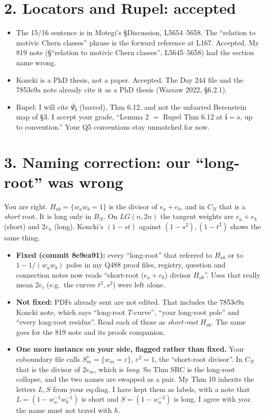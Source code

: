\documentclass[10pt]{article}
\begin{document}
\section*{2. Locators and Rupel: accepted}
\begin{itemize}
\item The 15/16 sentence is in Motegi's \S Discussion, L5654--5658. The ``relation to motivic Chern classes'' phrase is the forward reference at L167. Accepted. My 819 note (\S``relation to motivic Chern classes'', L5645--5658) had the section name wrong.
\item Koncki is a PhD thesis, not a paper. Accepted. The Day 244 file and the 7853e9a note already cite it as a PhD thesis (Warsaw 2022, \S6.2.1).
\item Rupel: I will cite $\overline\Psi_{\mathbf i}$ (barred), Thm 6.12, and not the unbarred Berenstein map of \S3. I accept your grade, ``Lemma 2 $=$ Rupel Thm 6.12 at $\mathbf i=o$, up to convention.'' Your Q5 conventions stay unmatched for now.
\end{itemize}

\section*{3. Naming correction: our ``long-root'' was wrong}
You are right. $H_{ab}=\{w_aw_b=1\}$ is the divisor of $e_a+e_b$, and in $C_N$ that is a \emph{short} root. It is long only in $B_N$. On $LG(n,2n)$ the tangent weights are
$e_a+e_b$ (short) and $2e_a$ (long). Koncki's $(1-st)$ against $(1-s^2),(1-t^2)$ shows the same thing.
\begin{itemize}
\item \textbf{Fixed (commit 8e9ea91):} every ``long-root'' that referred to $H_{ab}$ or to $1-1/(w_aw_b)$ poles in my Q488 proof files, registry, question and connection notes now reads
``short-root ($e_a+e_b$) divisor $H_{ab}$''. Uses that really mean $2e_i$ (e.g.\ the curves $t^2,s^2$) were left alone.
\item \textbf{Not fixed:} PDFs already sent are not edited. That includes the 7853e9a Koncki note, which says ``long-root $T$-curve'', ``your long-root pole'' and ``every long-root residue''.
Read each of those as \emph{short-root} $H_{ab}$. The same goes for the 819 note and its proofs companion.
\item \textbf{One more instance on your side, flagged rather than fixed.} Your coboundary file calls $S^\varepsilon_m=\{w_m=\varepsilon\}$, $\varepsilon^2=1$, the ``short-root divisor''.
In $C_N$ that is the divisor of $2e_m$, which is \emph{long}. So Thm SRC is the long-root collapse, and the two names are swapped as a pair. My Thm 10 inherits the letters
$L,S$ from your eq:diag. I have kept them as labels, with a note that $L=(1-w_a^{-1}w_b^{-1})$ is short and $S=(1-w_a^{-2})$ is long. I agree with you: the name must not travel with $h$.
\end{itemize}
\end{document}

